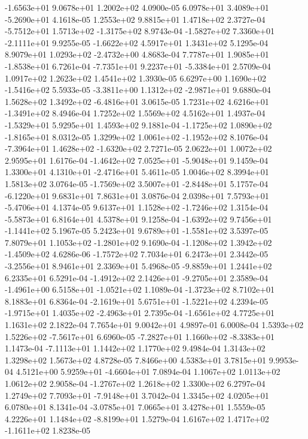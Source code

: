 -1.6563e+01  9.0678e+01  1.2002e+02  4.0900e-05
 6.0978e+01  3.4089e+01 -5.2690e+01  4.1618e-05
1.2553e+02 9.8815e+01 1.4718e+02  2.3727e-04
-5.7512e+01  1.5713e+02 -1.3175e+02  8.9743e-04
-1.5827e+02  7.3360e+01 -2.1111e+01  9.9255e-05
-1.6622e+02  4.5917e+01  1.3431e+02  5.1295e-04
 8.9079e+01  1.0293e+02 -2.4732e+00  4.8683e-04
 7.7787e+01  1.9085e+01 -1.8538e+01  6.7261e-04
-7.7351e+01  9.2237e+01 -5.3384e+01  2.5709e-04
1.0917e+02 1.2623e+02 1.4541e+02  1.3930e-05
 6.6297e+00  1.1690e+02 -1.5416e+02  5.5933e-05
-3.3811e+00  1.1312e+02 -2.9871e+01  9.6880e-04
 1.5628e+02  1.3492e+02 -6.4816e+01  3.0615e-05
 1.7231e+02  4.6216e+01 -1.3491e+02  8.4946e-04
1.7252e+02 1.5569e+02 4.5162e+01  1.4937e-04
-1.5329e+01  5.9295e+01  1.4593e+02  9.1881e-04
-1.1725e+02  1.0890e+02 -1.8165e+01  8.0312e-05
 1.3299e+02  1.0061e+02 -1.1952e+02  8.1076e-04
-7.3964e+01  1.4628e+02 -1.6320e+02  2.7271e-05
2.0622e+01 1.0072e+02 2.9595e+01  1.6176e-04
-1.4642e+02  7.0525e+01 -5.9048e+01  9.1459e-04
 1.3300e+01  4.1310e+01 -2.4716e+01  5.4611e-05
1.0046e+02 8.3994e+01 1.5813e+02  3.0764e-05
-1.7569e+02  3.5007e+01 -2.8448e+01  5.1757e-04
-6.1220e+01  9.6831e+01  7.8631e+01  3.0876e-04
 2.0398e+01  7.5793e+01 -5.4706e+01  4.1374e-05
 9.6137e+01  1.1528e+02 -1.7246e+02  1.3154e-04
-5.5873e+01  6.8164e+01  4.5378e+01  9.1258e-04
-1.6392e+02  9.7456e+01 -1.1441e+02  5.1967e-05
 5.2423e+01  9.6789e+01 -1.5581e+02  3.5397e-05
 7.8079e+01  1.1053e+02 -1.2801e+02  9.1690e-04
-1.1208e+02  1.3942e+02 -1.4509e+02  4.6286e-06
-1.7572e+02  7.7034e+01  6.2473e+01  2.3442e-05
-3.2556e+01  8.9461e+01  2.3369e+01  5.4968e-05
-9.8859e+01  1.2441e+02  6.2335e+01  6.5291e-04
-1.4912e+02  2.1426e+01 -9.2705e+01  2.3589e-04
-1.4961e+00  6.5158e+01 -1.0521e+02  1.1089e-04
-1.3723e+02  8.7102e+01  8.1883e+01  6.8364e-04
-2.1619e+01  5.6751e+01 -1.5221e+02  4.2394e-05
-1.9715e+01  1.4035e+02 -2.4963e+01  2.7395e-04
-1.6561e+02  4.7725e+01  1.1631e+02  2.1822e-04
7.7654e+01 9.0042e+01 4.9897e-01  6.0008e-04
 1.5393e+02  1.5226e+02 -7.5617e+01  6.6960e-05
-7.2827e+01  1.1660e+02 -8.3383e+01  1.1473e-04
-7.1113e+01  1.1442e+02  1.1770e+02  9.4984e-04
1.3143e+02 1.3298e+02 1.5673e+02  4.8728e-05
7.8466e+00 4.5383e+01 3.7815e+01  9.9953e-04
 4.5121e+00  5.9259e+01 -4.6604e+01  7.0894e-04
1.1067e+02 1.0113e+02 1.0612e+02  2.9058e-04
-1.2767e+02  1.2618e+02  1.3300e+02  6.2797e-04
 1.2749e+02  7.7093e+01 -7.9148e+01  3.7042e-04
1.3345e+02 4.0205e+01 6.0780e+01  8.1341e-04
-3.0785e+01  7.0665e+01  3.4278e+01  1.5559e-05
 4.2226e+01  1.1484e+02 -8.8199e+01  1.5279e-04
 1.6167e+02  1.4717e+02 -1.1611e+02  1.8238e-05
